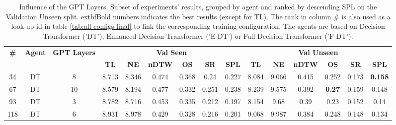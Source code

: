 \begin{table}
\centering
\caption{\label{tab:layers}Influence of the GPT Layers. Subset of experiments' results, grouped by agent and ranked by descending SPL on the Validation Unseen split. 	extbf{Bold} numbers indicates the best results (except for TL). The rank in column \# is also used as a look up id in table \ref{tab:all-configs-final} to link the corresponding training configuration.     \newline The agents are based on Decision Transformer ('DT'), Enhanced Decision Transformer ('E-DT') or Full Decision Transformer ('F-DT').}
\begin{tabular}{@{\hskip3pt}c@{\hskip3pt}c@{\hskip3pt}c@{\hskip3pt}c@{\hskip3pt}c@{\hskip3pt}c@{\hskip3pt}c@{\hskip3pt}c@{\hskip3pt}c@{\hskip3pt}c@{\hskip3pt}c@{\hskip3pt}c@{\hskip3pt}c@{\hskip3pt}c@{\hskip3pt}c}
\toprule
\textbf{\#} & \textbf{Agent} & \textbf{GPT Layers} & \multicolumn{6}{c}{\textbf{Val Seen}} & \multicolumn{6}{c}{\textbf{Val Unseen}} \\
 \textbf{~} &     \textbf{~} &          \textbf{~} &       \textbf{TL} &     \textbf{NE} &   \textbf{nDTW} &     \textbf{OS} &     \textbf{SR} &    \textbf{SPL} &         \textbf{TL} &     \textbf{NE} &   \textbf{nDTW} &    \textbf{OS} &     \textbf{SR} &    \textbf{SPL} \\
\midrule
         34 &             DT &                   8 &             8.713 &           8.346 &           0.474 &           0.368 &            0.24 &           0.227 &               8.084 &           9.066 &           0.415 &          0.252 &           0.173 &  \textbf{0.158} \\
         67 &             DT &                  10 &             8.579 &           8.194 &           0.477 &           0.332 &           0.251 &           0.238 &               8.239 &           9.575 &           0.392 &  \textbf{0.27} &           0.159 &           0.148 \\
         93 &             DT &                   3 &             8.782 &           8.716 &           0.453 &           0.335 &           0.212 &           0.197 &               8.154 &            9.68 &            0.39 &           0.23 &           0.152 &            0.14 \\
        118 &             DT &                   6 &             8.931 &           8.978 &           0.429 &           0.328 &           0.216 &           0.201 &               9.068 &           9.987 &           0.384 &          0.248 &           0.148 &           0.134 \\

\end{tabular}
\end{table}

